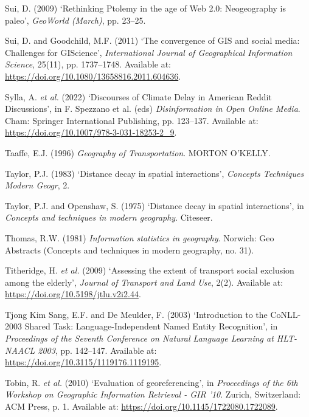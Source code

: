 \documentclass[
  letterpaper,
  11pt,
  english,
  onehalfspacing,
  headsepline]{MastersDoctoralThesis}
\newlength{\cslhangindent}
\newlength{\cslentryspacingunit} %
\newenvironment{CSLReferences}[2] %
 {%
  \setlength{\parindent}{0pt}
  \ifodd #1
  \let\oldpar\par
  \def\par{\hangindent=\cslhangindent\oldpar}
  \fi
  \setlength{\parskip}{#2\cslentryspacingunit}
 }%
 {}
\begin{document}
\begin{CSLReferences}{0}{0}
\leavevmode{}%
Sui, D. (2009) {`Rethinking {Ptolemy} in the age of {Web} 2.0:
{Neogeography} is paleo'}, \emph{GeoWorld (March)}, pp. 23--25.

\leavevmode{}%
Sui, D. and Goodchild, M.F. (2011) {`The convergence of {GIS} and social
media: Challenges for {GIScience}'}, \emph{International Journal of
Geographical Information Science}, 25(11), pp. 1737--1748. Available at:
\url{https://doi.org/10.1080/13658816.2011.604636}.

\leavevmode{}%
Sylla, A. \emph{et al.} (2022) {`Discourses of {Climate Delay} in
{American Reddit Discussions}'}, in F. Spezzano et al. (eds)
\emph{Disinformation in {Open Online Media}}. {Cham}: {Springer
International Publishing}, pp. 123--137. Available at:
\url{https://doi.org/10.1007/978-3-031-18253-2_9}.

\leavevmode{}%
Taaffe, E.J. (1996) \emph{Geography of {Transportation}}. {MORTON
O'KELLY}.

\leavevmode{}%
Taylor, P.J. (1983) {`Distance decay in spatial interactions'},
\emph{Concepts Techniques Modern Geogr}, 2.

\leavevmode{}%
Taylor, P.J. and Openshaw, S. (1975) {`Distance decay in spatial
interactions'}, in \emph{Concepts and techniques in modern geography}.
{Citeseer}.

\leavevmode{}%
Thomas, R.W. (1981) \emph{Information statistics in geography}.
{Norwich}: {Geo Abstracts} (Concepts and techniques in modern geography,
no. 31).

\leavevmode{}%
Titheridge, H. \emph{et al.} (2009) {`Assessing the extent of transport
social exclusion among the elderly'}, \emph{Journal of Transport and
Land Use}, 2(2). Available at:
\url{https://doi.org/10.5198/jtlu.v2i2.44}.

\leavevmode{}%
Tjong Kim Sang, E.F. and De Meulder, F. (2003) {`Introduction to the
{CoNLL-2003 Shared Task}: {Language-Independent Named Entity
Recognition}'}, in \emph{Proceedings of the {Seventh Conference} on
{Natural Language Learning} at {HLT-NAACL} 2003}, pp. 142--147.
Available at: \url{https://doi.org/10.3115/1119176.1119195}.

\leavevmode{}%
Tobin, R. \emph{et al.} (2010) {`Evaluation of georeferencing'}, in
\emph{Proceedings of the 6th {Workshop} on {Geographic Information
Retrieval} - {GIR} '10}. {Zurich, Switzerland}: {ACM Press}, p. 1.
Available at: \url{https://doi.org/10.1145/1722080.1722089}.


\end{CSLReferences}
\end{document}
